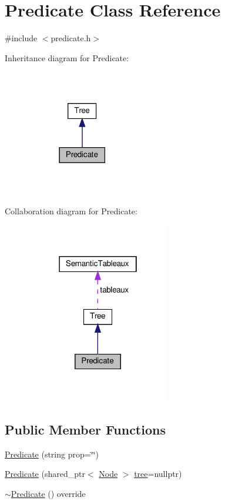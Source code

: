 \hypertarget{class_predicate}{}\section{Predicate Class Reference}
\label{class_predicate}


{\ttfamily \#include $<$predicate.\+h$>$}



Inheritance diagram for Predicate\+:\nopagebreak
\begin{figure}[H]
\begin{center}
\leavevmode
\includegraphics[width=138pt]{d1/d1c/class_predicate__inherit__graph}
\end{center}
\end{figure}


Collaboration diagram for Predicate\+:\nopagebreak
\begin{figure}[H]
\begin{center}
\leavevmode
\includegraphics[width=178pt]{d8/d59/class_predicate__coll__graph}
\end{center}
\end{figure}
\subsection*{Public Member Functions}
\begin{DoxyCompactItemize}
\item 
\hyperlink{class_predicate_aae9f9c0874342d8439f6c7ccaa44d76c}{Predicate} (string prop=\char`\"{}\char`\"{})
\item 
\hyperlink{class_predicate_a0ebfd4d64be4d59053157ca73e7bbd79}{Predicate} (shared\+\_\+ptr$<$ \hyperlink{class_node}{Node} $>$ \hyperlink{class_tree_a9c0875a8767528453814b8e3daf8f9af}{tree}=nullptr)
\item 
\hyperlink{class_predicate_a0ba364e4092dee9b9c43e0c447f36de3}{$\sim$\+Predicate} () override
\end{DoxyCompactItemize}
